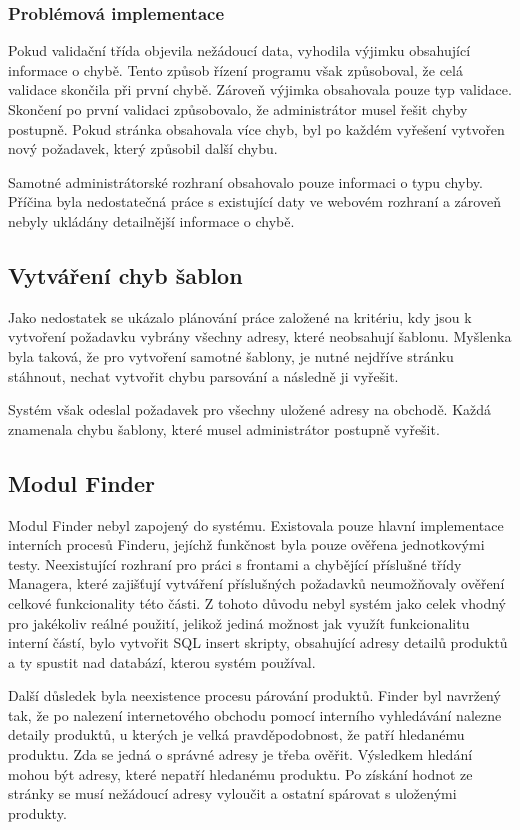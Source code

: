 \documentclass[thesis=B,czech]{FITthesis}[2012/06/26]
\begin{document}
\subsubsection{Problémová implementace}
Pokud validační třída objevila nežádoucí data, vyhodila výjimku obsahující informace o chybě. Tento způsob řízení programu však způsoboval, že celá validace skončila při první chybě. Zároveň výjimka obsahovala pouze typ validace. 
Skončení po první validaci způsobovalo, že administrátor musel řešit chyby postupně. 
Pokud stránka obsahovala více chyb, byl po každém vyřešení vytvořen nový požadavek, který způsobil další chybu.
\par
Samotné administrátorské rozhraní obsahovalo pouze informaci o typu chyby. Příčina byla nedostatečná práce s existující daty ve webovém rozhraní
a zároveň nebyly ukládány detailnější informace o chybě. 

\subsection{Vytváření chyb šablon}
Jako nedostatek se ukázalo plánování práce založené na kritériu, kdy jsou k vytvoření požadavku vybrány všechny adresy, které neobsahují šablonu.
Myšlenka byla taková, že pro vytvoření samotné šablony, je nutné nejdříve stránku stáhnout, nechat vytvořit chybu parsování
a následně ji vyřešit.
\par
Systém však odeslal požadavek pro všechny uložené adresy na obchodě. Každá znamenala chybu šablony, které musel administrátor postupně vyřešit.

\subsection{Modul Finder}
Modul Finder nebyl zapojený do systému. Existovala pouze hlavní implementace interních procesů Finderu, jejíchž funkčnost byla
pouze ověřena jednotkovými testy. Neexistující rozhraní pro práci s frontami a chybějící příslušné třídy Managera, které zajišťují vytváření příslušných požadavků neumožňovaly ověření celkové funkcionality této části. Z tohoto důvodu nebyl systém jako celek vhodný pro jakékoliv reálné použití, jelikož
jediná možnost jak využít funkcionalitu interní částí, bylo vytvořit SQL insert skripty, obsahující adresy detailů produktů
a ty spustit nad databází, kterou systém používal.
\par
Další důsledek byla neexistence procesu párování produktů. Finder byl navržený tak, že po nalezení internetového obchodu
pomocí interního vyhledávání nalezne detaily produktů, u kterých je velká pravděpodobnost, že patří hledanému produktu.
Zda se jedná o správné adresy je třeba ověřit. Výsledkem hledání mohou být adresy, které nepatří hledanému produktu. Po získání hodnot ze stránky se musí nežádoucí adresy vyloučit a ostatní spárovat s uloženými produkty.
\end{document}

